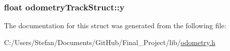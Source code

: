 \hypertarget{structodometry_track_struct_a4fe013b85dc8b7571a00f1d38ecf9b07}{
\subsubsection[{y}]{\setlength{\rightskip}{0pt plus 5cm}float odometry\+Track\+Struct\+::y}}\label{structodometry_track_struct_a4fe013b85dc8b7571a00f1d38ecf9b07}


The documentation for this struct was generated from the following file\+:\begin{DoxyCompactItemize}
\item 
C\+:/\+Users/\+Stefan/\+Documents/\+Git\+Hub/\+Final\+\_\+\+Project/lib/\hyperlink{odometry_8h}{odometry.\+h}\end{DoxyCompactItemize}
